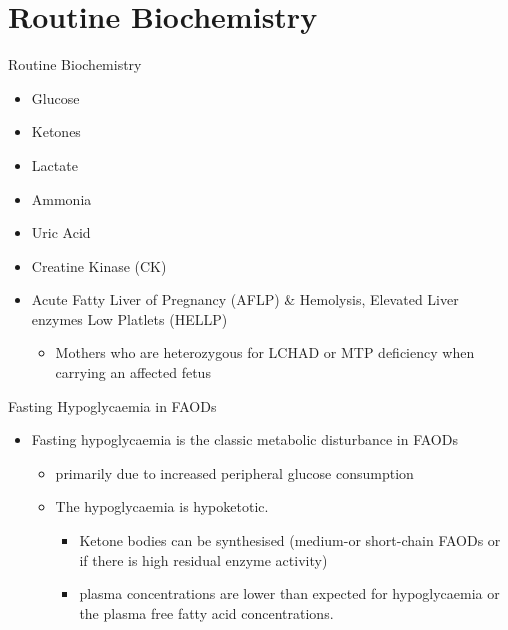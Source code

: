 \documentclass[presentation, smaller]{beamer}
\begin{document}
\section{Routine Biochemistry}
\label{sec:orgheadline21}
\begin{frame}[label={sec:orgheadline9}]{Routine Biochemistry}
\begin{itemize}
\item Glucose
\item Ketones
\item Lactate
\item Ammonia
\item Uric Acid
\item Creatine Kinase (CK)
\item Acute Fatty Liver of Pregnancy (AFLP) \& Hemolysis, Elevated Liver enzymes Low Platlets (HELLP)
\begin{itemize}
\item Mothers who are heterozygous for LCHAD or MTP deficiency when
carrying an affected fetus
\end{itemize}
\end{itemize}
\end{frame}
\begin{frame}[label={sec:orgheadline10}]{Fasting Hypoglycaemia  in FAODs}
\begin{itemize}
\item Fasting hypoglycaemia is the classic metabolic disturbance in FAODs
\begin{itemize}
\item primarily due to increased peripheral glucose consumption
\end{itemize}
\begin{itemize}
\item The hypoglycaemia is hypoketotic.
\begin{itemize}
\item Ketone bodies can be synthesised (medium-or short-chain FAODs or
if there is high residual enzyme activity)
\item plasma concentrations are lower than expected for hypoglycaemia or
the plasma free fatty acid concentrations.
\end{itemize}
\end{itemize}
\end{itemize}
\end{frame}
\end{document}
